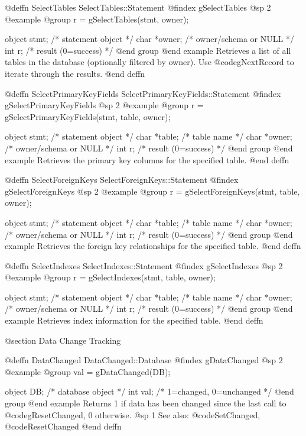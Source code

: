 @deffn {SelectTables} SelectTables::Statement
@findex gSelectTables
@sp 2
@example
@group
r = gSelectTables(stmt, owner);

object  stmt;    /*  statement object        */
char    *owner;  /*  owner/schema or NULL    */
int     r;       /*  result (0=success)      */
@end group
@end example
Retrieves a list of all tables in the database (optionally filtered by
owner).  Use @code{gNextRecord} to iterate through the results.
@end deffn



@deffn {SelectPrimaryKeyFields} SelectPrimaryKeyFields::Statement
@findex gSelectPrimaryKeyFields
@sp 2
@example
@group
r = gSelectPrimaryKeyFields(stmt, table, owner);

object  stmt;    /*  statement object        */
char    *table;  /*  table name              */
char    *owner;  /*  owner/schema or NULL    */
int     r;       /*  result (0=success)      */
@end group
@end example
Retrieves the primary key columns for the specified table.
@end deffn



@deffn {SelectForeignKeys} SelectForeignKeys::Statement
@findex gSelectForeignKeys
@sp 2
@example
@group
r = gSelectForeignKeys(stmt, table, owner);

object  stmt;    /*  statement object        */
char    *table;  /*  table name              */
char    *owner;  /*  owner/schema or NULL    */
int     r;       /*  result (0=success)      */
@end group
@end example
Retrieves the foreign key relationships for the specified table.
@end deffn



@deffn {SelectIndexes} SelectIndexes::Statement
@findex gSelectIndexes
@sp 2
@example
@group
r = gSelectIndexes(stmt, table, owner);

object  stmt;    /*  statement object        */
char    *table;  /*  table name              */
char    *owner;  /*  owner/schema or NULL    */
int     r;       /*  result (0=success)      */
@end group
@end example
Retrieves index information for the specified table.
@end deffn



@section Data Change Tracking


@deffn {DataChanged} DataChanged::Database
@findex gDataChanged
@sp 2
@example
@group
val = gDataChanged(DB);

object  DB;    /*  database object          */
int     val;   /*  1=changed, 0=unchanged   */
@end group
@end example
Returns 1 if data has been changed since the last call to
@code{gResetChanged}, 0 otherwise.
@sp 1
See also:  @code{SetChanged}, @code{ResetChanged}
@end deffn



